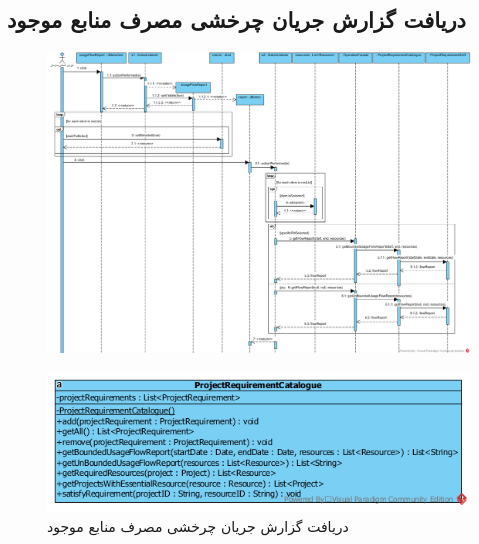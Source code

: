 \begin{landscape}
\section{دریافت گزارش جریان چرخشی مصرف منابع موجود}
\begin{figure}[H]
	\centering
	\includegraphics[scale=0.55]{img/sequence-design/UsageFlowReport}
\end{figure}
\begin{figure}[H]
	\centering
	\includegraphics[scale=0.7]{img/sequence-design/UsageFlowReportC}
	\caption{دریافت گزارش جریان چرخشی مصرف منابع موجود}
\end{figure}

\newpage

\end{landscape}
